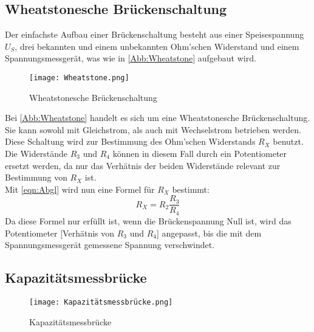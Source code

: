 \subsection{Wheatstonesche Brückenschaltung}
 
Der einfachste Aufbau einer Brückenschaltung besteht aus einer Speisespannung $U_S$, drei bekannten und einem unbekannten Ohm'schen Widerstand und
einem Spannungsmessgerät, was wie in \autoref{Abb:Wheatstone} aufgebaut wird.

\begin{figure}
    \centering
    \texttt{[image: Wheatstone.png]}
    \caption{Wheatstonesche Brückenschaltung \cite{Blatt}}
    \label{Abb:Wheatstone}
\end{figure}

Bei \autoref{Abb:Wheatstone} handelt es sich um eine Wheatstonesche Brückenschaltung. Sie kann sowohl mit Gleichstrom, als auch mit Wechselstrom betrieben werden.
Diese Schaltung wird zur Bestimmung des Ohm'schen Widerstands $R_X$ benutzt. Die Widerstände $R_3$ und $R_4$ können in diesem Fall durch ein Potentiometer ersetzt werden,
da nur das Verhätnis der beiden Widerstände relevant zur Bestimmung von $R_X$ ist. \\
Mit \autoref{eqn:Abgl} wird nun eine Formel für $R_X$ bestimmt:
\begin{equation}
    R_X = R_2 \frac{R_3}{R_4} \label{eqn: RXW}
\end{equation}
Da diese Formel nur erfüllt ist, wenn die Brückenspannung Null ist, wird das Potentiometer [Verhätnis von $R_3$ und $R_4$] angepasst, bis die
mit dem Spannungsmessgerät gemessene Spannung verschwindet.

\subsection{Kapazitätsmessbrücke}

\begin{figure}
    \centering
    \texttt{[image: Kapazitätsmessbrücke.png]}
    \caption{Kapazitätsmessbrücke \cite{Blatt}}
    \label{Abb:Kapazitaetsmessbruecke}
\end{figure}


